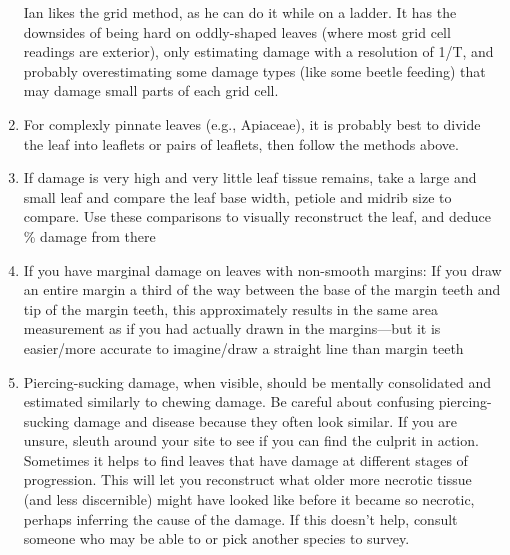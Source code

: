 \documentclass[
  letterpaper,
  oneside,
  open=any]{scrbook}
\begin{document}
\begin{enumerate}
  Ian likes the grid method, as he can do it while on a ladder. It has
  the downsides of being hard on oddly-shaped leaves (where most grid
  cell readings are exterior), only estimating damage with a resolution
  of 1/T, and probably overestimating some damage types (like some
  beetle feeding) that may damage small parts of each grid cell.
\item
  For complexly pinnate leaves (e.g., Apiaceae), it is probably best to
  divide the leaf into leaflets or pairs of leaflets, then follow the
  methods above.
\item
  If damage is very high and very little leaf tissue remains, take a
  large and small leaf and compare the leaf base width, petiole and
  midrib size to compare. Use these comparisons to visually reconstruct
  the leaf, and deduce \% damage from there
\item
  If you have marginal damage on leaves with non-smooth margins: If you
  draw an entire margin a third of the way between the base of the
  margin teeth and tip of the margin teeth, this approximately results
  in the same area measurement as if you had actually drawn in the
  margins---but it is easier/more accurate to imagine/draw a straight
  line than margin teeth
\item
  Piercing-sucking damage, when visible, should be mentally consolidated
  and estimated similarly to chewing damage. Be careful about confusing
  piercing-sucking damage and disease because they often look similar.
  If you are unsure, sleuth around your site to see if you can find the
  culprit in action. Sometimes it helps to find leaves that have damage
  at different stages of progression. This will let you reconstruct what
  older more necrotic tissue (and less discernible) might have looked
  like before it became so necrotic, perhaps inferring the cause of the
  damage. If this doesn't help, consult someone who may be able to or
  pick another species to survey.
\end{enumerate}
\end{document}
